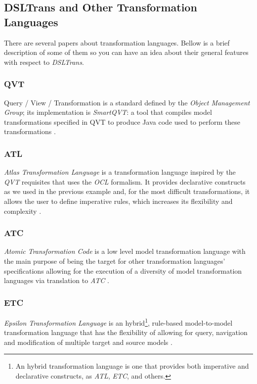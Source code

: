 \clearpage

\subsection{DSLTrans and Other Transformation Languages}
\label{subsubsec:other_languages}

There are several papers about transformation languages. Bellow is a brief description of some of them so you can have an idea about their general features with respect to \emph{DSLTrans}.


\subsubsection{QVT} 

Query / View / Transformation is a standard defined by the
\emph{Object Management Group}; its implementation is \emph{SmartQVT}: a
tool that compiles model transformations specified in QVT to produce Java code
used to perform these transformations \cite{qvt_transformation_language}.

\subsubsection{ATL} 

\emph{Atlas Transformation Language} is a transformation
language inspired by the \emph{QVT} requisites that uses the \emph{OCL}
formalism. It provides declarative constructs as we used in the previous example
and, for the most difficult transformations, it allows the user to define
imperative rules, which increases its flexibility and complexity
\cite{atl_transformation_tool}.

\subsubsection{ATC} 

\emph{Atomic Transformation Code} is a low level model transformation language
with the main purpose of being the target for other transformation
languages' specifications allowing for the execution of a diversity of model
transformation languages via translation to \emph{ATC} \cite{atc_user_guide}.


\subsubsection{ETC}

\emph{Epsilon Transformation Language} is an hybrid\footnote{ An hybrid transformation language is one that provides both imperative and
declarative constructs, as \emph{ATL}, \emph{ETC}, and others.}, rule-based model-to-model transformation language that has the flexibility of allowing for query, navigation and
modification of multiple target and source models \cite{epsilon_eclipse}.


